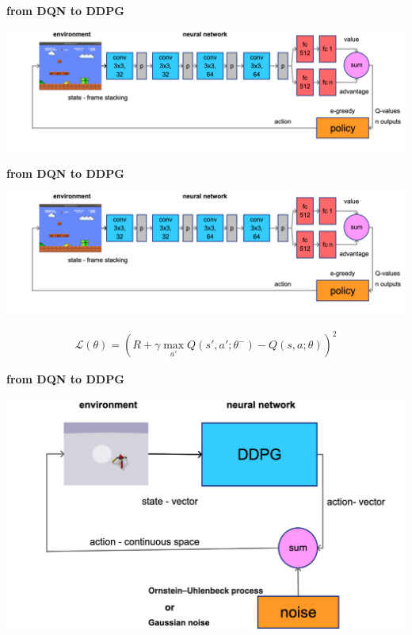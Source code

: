 \documentclass[xcolor=dvipsnames]{beamer}
\begin{document}
\begin{frame}{\bf from DQN to DDPG}

  {\centering \includegraphics[scale=0.14]{../diagrams/dqndetail.png}}
\end{frame}

\begin{frame}{\bf from DQN to DDPG}

  {\centering \includegraphics[scale=0.14]{../diagrams/dqndetail.png}}

    \begin{align*}
      \mathcal{L(\theta)} = \left( R + \gamma \max \limits_{a'} Q(s', a'; \theta^-) - Q(s, a; \theta)  \right)^2
    \end{align*}
\end{frame}

\begin{frame}{\bf from DQN to DDPG}

  {\centering \includegraphics[scale=0.2]{../diagrams/ddpg.png}}
\end{frame}
\end{document}
